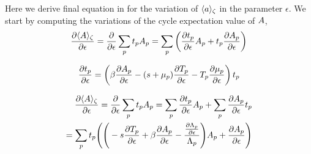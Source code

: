 \documentclass[aps,pre,
                showpacs,
                twocolumn,
                groupedaddress,
                superscriptaddress,
                floatfix]{revtex4-1}
\begin{document}
Here we derive final equation in  for the
variation of $\langle {a} \rangle_{\zeta}$ in the parameter $\epsilon$.
We
start by computing the variations of the cycle expectation value of $A$,
\begin{eqnarray*}
\frac{\partial \langle {\ensuremath{A}} \rangle_{\zeta}}{\partial \epsilon}
= \frac{\partial}{\partial \epsilon}\sum_{p}t_{p}A_{p}
= \sum_{p}\left(\frac{\partial t_{p}}{\partial \epsilon}A_{p}
                + t_{p} \frac{\partial A_{p}}{\partial \epsilon} \right)
\end{eqnarray*}

\[
\frac{\pde t_{p}}{\pde \epsilon}
    =
\left(
  \beta \frac{\pde \Obser_{p}}{\pde \epsilon}
 -(s+\eigRe_p)\frac{\pde \period{p}}{\pde \epsilon}
 - \period{p}\frac{\pde \eigRe_p}{\pde \epsilon}
\right) t_{p}
\]

\begin{eqnarray*}
\frac{\partial \langle {\ensuremath{A}} \rangle_{\zeta}}{\partial \epsilon}
= \frac{\partial}{\partial \epsilon}\sum_{p}t_{p}A_{p}
= \sum_{p}\frac{\partial t_{p}}{\partial \epsilon}A_{p} + \sum_{p} \frac{\partial A_{p}}{\partial \epsilon} t_{p}
\\ = \sum_{p}t_{p}\Bigg( \Bigg( -s\frac{\partial {\ensuremath{T_{p}}}}{\partial \epsilon} + \beta \frac{\partial A_{p}}{\partial \epsilon} - \frac{\frac{\partial \Lambda_{p}}{\partial \epsilon}}{\Lambda_{p}}\Bigg) A_{p} +\frac{\partial A_{p}}{\partial \epsilon} \Bigg)
\end{eqnarray*}
\end{document}
